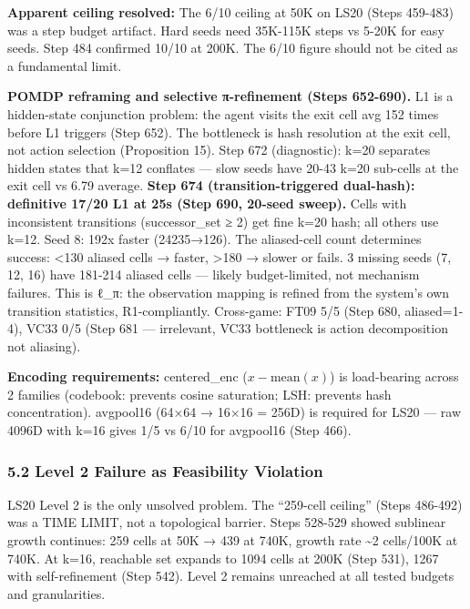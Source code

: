 \documentclass[
  11pt,
]{article}
\begin{document}
\textbf{Apparent ceiling resolved:} The 6/10 ceiling at 50K on LS20
(Steps 459-483) was a step budget artifact. Hard seeds need 35K-115K
steps vs 5-20K for easy seeds. Step 484 confirmed 10/10 at 200K. The
6/10 figure should not be cited as a fundamental limit.

\textbf{POMDP reframing and selective π-refinement (Steps 652-690).} L1
is a hidden-state conjunction problem: the agent visits the exit cell
avg 152 times before L1 triggers (Step 652). The bottleneck is hash
resolution at the exit cell, not action selection (Proposition 15). Step
672 (diagnostic): k=20 separates hidden states that k=12 conflates ---
slow seeds have 20-43 k=20 sub-cells at the exit cell vs 6.79 average.
\textbf{Step 674 (transition-triggered dual-hash): definitive 17/20 L1
at 25s (Step 690, 20-seed sweep).} Cells with inconsistent transitions
(\textbar successor\_set\textbar{} ≥ 2) get fine k=20 hash; all others
use k=12. Seed 8: 192x faster (24235→126). The aliased-cell count
determines success: \textless130 aliased cells → faster, \textgreater180
→ slower or fails. 3 missing seeds (7, 12, 16) have 181-214 aliased
cells --- likely budget-limited, not mechanism failures. This is ℓ\_π:
the observation mapping is refined from the system's own transition
statistics, R1-compliantly. Cross-game: FT09 5/5 (Step 680,
aliased=1-4), VC33 0/5 (Step 681 --- irrelevant, VC33 bottleneck is
action decomposition not aliasing).

\textbf{Encoding requirements:} centered\_enc (\(x - \text{mean}(x)\))
is load-bearing across 2 families (codebook: prevents cosine saturation;
LSH: prevents hash concentration). avgpool16 (64×64 → 16×16 = 256D) is
required for LS20 --- raw 4096D with k=16 gives 1/5 vs 6/10 for
avgpool16 (Step 466).

\subsubsection{5.2 Level 2 Failure as Feasibility
Violation}\label{level-2-failure-as-feasibility-violation}

LS20 Level 2 is the only unsolved problem. The ``259-cell ceiling''
(Steps 486-492) was a TIME LIMIT, not a topological barrier. Steps
528-529 showed sublinear growth continues: 259 cells at 50K → 439 at
740K, growth rate \textasciitilde2 cells/100K at 740K. At k=16,
reachable set expands to 1094 cells at 200K (Step 531), 1267 with
self-refinement (Step 542). Level 2 remains unreached at all tested
budgets and granularities.
\end{document}
